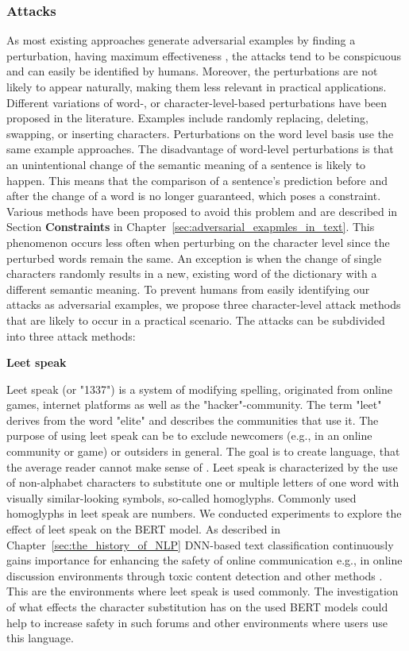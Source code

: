 \subsubsection{Attacks}
\label{sec:attacks_method}
As most existing approaches generate adversarial examples by finding a perturbation, having maximum effectiveness \cite{liang2017deep, ebrahimi2017hotflip, gao2018black, li2018textbugger, alzantot2018generating, jin2019bert, garg2020bae}, the attacks tend to be conspicuous and can easily be identified by humans. Moreover, the perturbations are not likely to appear naturally, making them less relevant in practical applications. Different variations of word-, or character-level-based perturbations have been proposed in the literature. Examples include randomly replacing, deleting, swapping, or inserting characters. Perturbations on the word level basis use the same example approaches.  
The disadvantage of word-level perturbations is that an unintentional change of the semantic meaning of a sentence is likely to happen. This means that the comparison of a sentence's prediction before and after the change of a word is no longer guaranteed, which poses a constraint. Various methods have been proposed to avoid this problem and are described in Section \textbf{Constraints} in Chapter~\ref{sec:adversarial_exapmles_in_text}. 
This phenomenon occurs less often when perturbing on the character level since the perturbed words remain the same. An exception is when the change of single characters randomly results in a new, existing word of the dictionary with a different semantic meaning. 
To prevent humans from easily identifying our attacks as adversarial examples, we propose three character-level attack methods that are likely to occur in a practical scenario. The attacks can be subdivided into three attack methods:


\textbf{Leet speak}

Leet speak (or "1337") is a system of modifying spelling, originated from online games, internet platforms as well as the "hacker"-community. The term "leet" derives from the word "elite" and describes the communities that use it. The purpose of using leet speak can be to exclude newcomers (e.g., in an online community or game) or outsiders in general. The goal is to create language, that the average reader cannot make sense of \cite{thomas2002hacker}.
Leet speak is characterized by the use of non-alphabet characters to substitute one or multiple letters of one word with visually similar-looking symbols, so-called homoglyphs. Commonly used homoglyphs in leet speak are numbers. 
We conducted experiments to explore the effect of leet speak on the BERT model. As described in Chapter~\ref{sec:the_history_of_NLP} DNN-based text classification continuously gains importance for enhancing the safety of online communication e.g., in online discussion environments through toxic content detection and other methods \cite{kumar2011natural}. This are the environments where leet speak is used commonly. The investigation of what effects the character substitution has on the used BERT models could help to increase safety in such forums and other environments where users use this language. 

